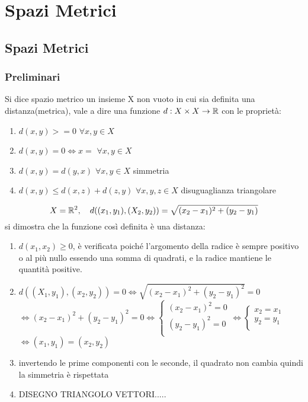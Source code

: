 \part{Spazi Metrici}
\chapter{Spazi Metrici}

\section{Preliminari}
Si dice spazio metrico un insieme X non vuoto in cui sia definita una
distanza(metrica), vale a dire una funzione $d: X \times X \rightarrow \mathbb{R}$ con le proprietà:
\begin{enumerate}
	\item $d(x,y)>=0$ $\forall x,y \in X$
	\item $d(x,y)=0\Leftrightarrow x=$ $\forall x,y \in X$
	\item $d(x,y)=d(y,x)$ $\forall x,y \in X$ simmetria
	\item $d(x,y)\le d(x,z)+d(z,y)$ $\forall x,y,z\in X$ disuguaglianza triangolare 
\end{enumerate}

\example
$$X=\mathbb{R}^{2},\quad d((x_1,y_1),(X_2,y_2))=\sqrt{(x_2-x_1)^2+(y_2-y_1)}$$
si dimostra che la funzione così definita è una distanza:
\begin{enumerate}
	\item $d(x_1,x_2)\ge 0$, è verificata poiché l'argomento della radice è sempre positivo o al più nullo essendo una somma di quadrati, e la radice mantiene le quantità positive.
	\item $d((X_1,y_1),(x_2,y_2))=0\Leftrightarrow \sqrt{(x_2-x_1)^2+(y_2-y_1)^2}=0$\\
	$\Leftrightarrow (x_2-x_1)^2+(y_2-y_1)^2=0 \Leftrightarrow 
	\left\{\begin{matrix}
	(x_2-x_1)^2=0\\
	(y_2-y_1)^2=0\\
	\end{matrix}\right.\Leftrightarrow
	\left\{\begin{matrix}
	x_2=x_1\\
	y_2=y_1\\
	\end{matrix}\right.$\\
	$\Leftrightarrow (x_1,y_1)=(x_2,y_2)$
	\item invertendo le prime componenti con le seconde, il quadrato non cambia quindi la simmetria è rispettata
	\item 
	DISEGNO TRIANGOLO VETTORI.....
\end{enumerate}

